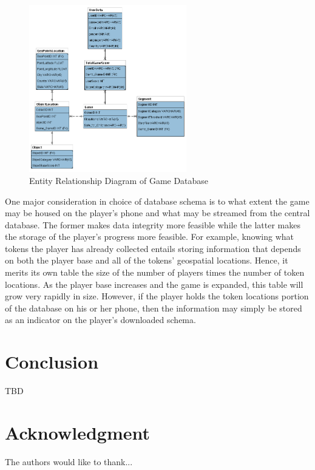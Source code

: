 \documentclass[conference]{IEEEtran}
\begin{document}
\begin{figure}[H]
\centering
\includegraphics[width=2.7in]{imgs/MSDS7330_FinalProj_Prelim_ER2.png}
\caption{Entity Relationship Diagram of Game Database}
\label{ERD}
\end{figure}

One major consideration in choice of database schema is to what extent the game may be housed on the player’s phone and what may be streamed from the central database. The former makes data integrity more feasible while the latter makes the storage of the player’s progress more feasible. For example, knowing what tokens the player has already collected entails storing information that depends on both the player base and all of the tokens’ geospatial locations. Hence, it merits its own table the size of the number of players times the number of token locations.  As the player base increases and the game is expanded, this table will grow very rapidly in size. However, if the player holds the token locations portion of the database on his or her phone, then the information may simply be stored as an indicator on the player’s downloaded schema. 


\section{Conclusion}
TBD

\section*{Acknowledgment}


The authors would like to thank...
\end{document}

